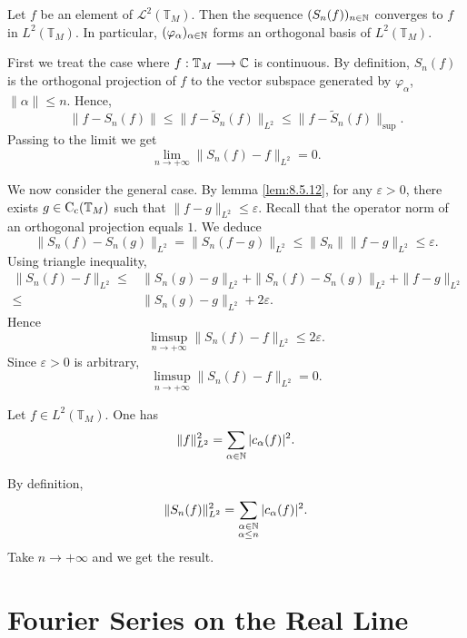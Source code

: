 \begin{theoremenv}
    Let $f$ be an element of $\mathcal{L}^2(\mathbb{T}_{M})$.
    Then the sequence $(S_n(f))_{n \in \mathbb{N}}$ converges to $f$ in $L^2(\mathbb{T}_{M})$.
    In particular, $(\varphi_{\alpha})_{\alpha \in \mathbb{N}}$ forms an orthogonal basis of $L^2(\mathbb{T}_{M})$.
\end{theoremenv}
\begin{proofenv}
    First we treat the case where $f : \mathbb{T}_{M} \longrightarrow \mathbb{C}$ is continuous.
    By definition, $S_{n}(f)$ is the orthogonal projection of $f$ to the vector subspace generated by $\varphi_{\alpha}$, $\|\alpha\| \le n$.
    Hence,
    $$\|f - S_{n}(f)\| \le \|f - \tilde{S}_{n}(f)\|_{L^2} \le \|f - \tilde{S}_{n}(f)\|_{\mathrm{sup}}.$$
    Passing to the limit we get
    $$\lim_{n \rightarrow +\infty} \|S_{n}(f) - f\|_{L^2} = 0.$$
    
    \quad We now consider the general case.
    By lemma \ref{lem:8.5.12}, for any $\varepsilon > 0$, there exists $g \in \operatorname{C_{c}}(\mathbb{T}_{M})$ such that $\|f - g\|_{L^2} \le \varepsilon$.
    Recall that the operator norm of an orthogonal projection equals $1$.
    We deduce
    $$\|S_{n}(f) - S_{n}(g)\|_{L^2} = \|S_{n}(f - g)\|_{L^2} \le \|S_{n}\| \|f - g\|_{L^2} \le \varepsilon.$$
    Using triangle inequality,
    $$\begin{aligned}
        \|S_{n}(f) - f\|_{L^2} \le & \|S_{n}(g) - g\|_{L^2} + \|S_n(f) - S_{n}(g)\|_{L^2} + \| f - g\|_{L^2}\\
        \le & \|S_n(g) - g\|_{L^2} + 2 \varepsilon.
    \end{aligned}$$
    Hence
    $$\limsup_{n \to +\infty} \|S_{n}(f) - f\|_{L^2} \le 2 \varepsilon.$$
    Since $\varepsilon > 0$ is arbitrary,
    $$\limsup_{n \to +\infty} \|S_{n}(f) - f\|_{L^2} = 0.$$
\end{proofenv}

\begin{corollaryenv}
    Let $f \in L^2(\mathbb{T}_{M})$.
    One has
    $$\|f\|^2_{L^2} = \sum_{\alpha \in \mathbb{N}} |c_{\alpha} (f)|^2.$$
\end{corollaryenv}
\begin{proofenv}
    By definition,
    $$\|S_{n}(f)\|_{L^2}^2 = \sum_{\substack{\alpha \in \mathbb{N}\\ \alpha \le n}} |c_{\alpha} (f)|^2.$$
    Take $n \to +\infty$ and we get the result.
\end{proofenv}


\section{Fourier Series on the Real Line}


